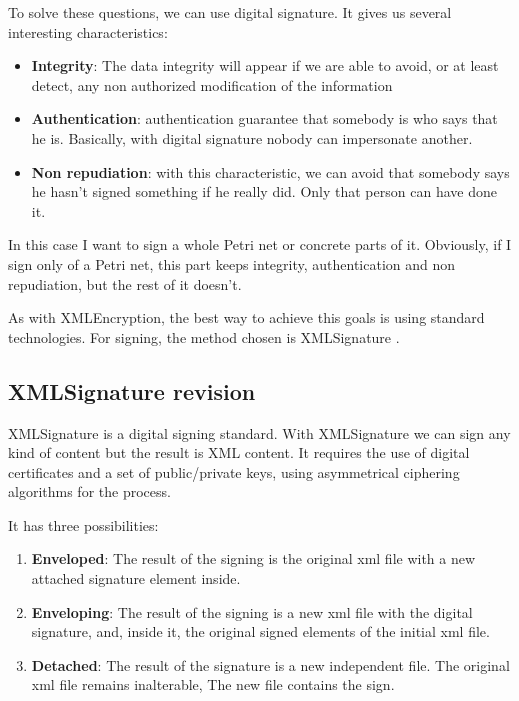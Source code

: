 To solve these questions, we can use digital signature. It gives us several
interesting characteristics:
\begin{itemize}
\item \textbf{Integrity}: The data integrity will appear if we are able to
avoid, or at least detect, any non authorized modification of the information
\item \textbf{Authentication}: authentication guarantee that somebody is
who says that he is. Basically, with digital signature nobody can impersonate another.
\item \textbf{Non repudiation}: with this characteristic, we can avoid that
somebody says he hasn't signed something if he really did. Only that person
can have done it.

\end{itemize}

In this case I want to sign a whole Petri net or concrete parts of it. Obviously,
if I sign only of a Petri net, this part keeps integrity, authentication
and non repudiation, but the rest of it doesn't.

As with XMLEncryption, the best way to achieve this goals is using standard
technologies. For signing, the method chosen is XMLSignature \cite{XMLSIG-w3.org/xmlsig-core1}.


\subsection{XMLSignature revision}
XMLSignature is a digital signing standard. With XMLSignature we can sign any kind of content but the result is XML content. It requires the use of
digital certificates and a set of public/private keys, using asymmetrical
ciphering algorithms for the process.

It has three possibilities:

\begin{enumerate}
\item \textbf{Enveloped}: The result of the signing is the original xml file
with a new attached signature element inside.
\item \textbf{Enveloping}: The result of the signing is a new xml file with
the digital signature, and, inside it, the original signed elements of the initial xml file.
\item \textbf{Detached}: The result of the signature is a new independent file.
The original xml file remains inalterable, The new file contains the sign.
\end{enumerate}

